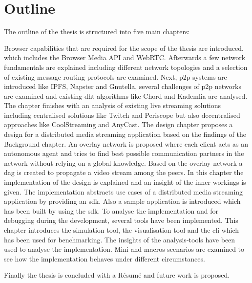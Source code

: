 \section{Outline}
The outline of the thesis is structured into five main chapters:
\begin{itemize}
     Browser capabilities that are required for the scope of the thesis are introduced, which includes the Browser Media API and WebRTC. Afterwards a few network fundamentals are explained including different network topologies and a selection of existing message routing protocols are examined. Next, \gls{p2p} systems are introduced like IPFS, Napster and Gnutella, several challenges of \gls{p2p} networks are examined and existing \gls{dht} algorithms like Chord and Kademlia are analysed. The chapter finishes with an analysis of existing live streaming solutions including centralised solutions like Twitch and Periscope but also decentralised approaches like CoolStreaming and AnyCast.   
     The design chapter proposes a design for a distributed media streaming application based on the findings of the Background chapter. An overlay network is proposed where each client acts as an autonomous agent and tries to find best possible communication partners in the network without relying on a global knowledge. Based on the overlay network a \gls{dag} is created to propagate a video stream among the peers.
     In this chapter the implementation of the design is explained and an insight of the inner workings is given. The implementation abstracts use cases of a distributed media streaming application by providing an \gls{sdk}. Also a sample application is introduced which has been built by using the \gls{sdk}.
     To analyse the implementation and for debugging during the development, several tools have been implemented. This chapter introduces the simulation tool, the visualisation tool and the \gls{cli} which has been used for benchmarking.
     The insights of the analysis-tools have been used to analyse the implementation. Mini and macros scenarios are examined to see how the implementation behaves under different circumstances. 
\end{itemize}
Finally the thesis is concluded with a Résumé and future work is proposed.
